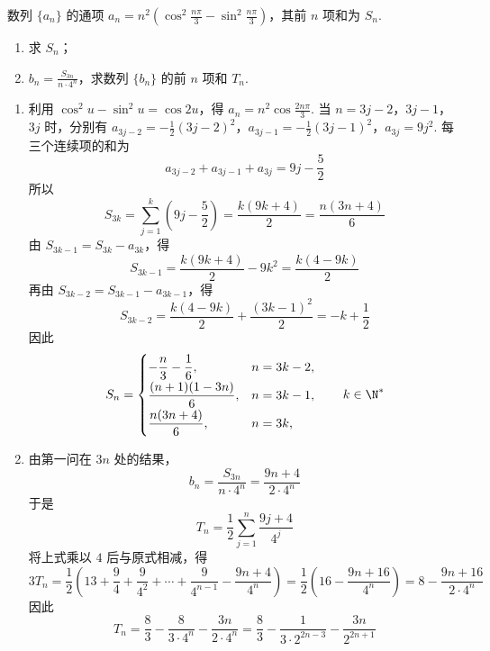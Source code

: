 \begin{problem}
数列 \(\{a_{n}\}\) 的通项 \(a_{n} = n^{2}\left(\cos^{2}\frac{n\pi}{3} - \sin^{2}\frac{n\pi}{3}\right)\)，其前 \(n\) 项和为 \(S_{n}\).

\begin{enumerate}
\item 求 \(S_{n}\)；
\item \( b_{n}=\frac{S_{3n}}{n\cdot4^{n}} \)，求数列 \(\{b_{n}\}\) 的前 \(n\) 项和 \(T_{n}\).
\end{enumerate}
\begin{solution}
\begin{enumerate}
\item
利用 \(\cos^{2}u-\sin^{2}u=\cos2u\)，得 \(a_n=n^{2}\cos\frac{2n\pi}{3}\). 当 \(n=3j-2\)，\(3j-1\)，\(3j\) 时，分别有
\(a_{3j-2}=-\frac12(3j-2)^{2}\)，\(a_{3j-1}=-\frac12(3j-1)^{2}\)，\(a_{3j}=9j^{2}\).
每三个连续项的和为
\[
a_{3j-2}+a_{3j-1}+a_{3j}=9j-\frac52
\]
所以
\[
S_{3k}=\sum_{j=1}^{k}\left(9j-\frac52\right)=\frac{k(9k+4)}2=\frac{n(3n+4)}6
\]
由 \(S_{3k-1}=S_{3k}-a_{3k}\)，得
\[
S_{3k-1}=\frac{k(9k+4)}2-9k^{2}=\frac{k(4-9k)}2
\]
再由 \(S_{3k-2}=S_{3k-1}-a_{3k-1}\)，得
\[
S_{3k-2}=\frac{k(4-9k)}2+\frac{(3k-1)^{2}}2=-k+\frac12
\]
因此
\[
S_n=
\begin{cases}
-\dfrac{n}{3}-\dfrac{1}{6},&n=3k-2,\\[4pt]
\dfrac{(n+1)(1-3n)}6,&n=3k-1,\\[4pt]
\dfrac{n(3n+4)}6,&n=3k,
\end{cases}
\qquad k\in\N^*
\]

\item
由第一问在 \(3n\) 处的结果，
\[
b_n=\frac{S_{3n}}{n\cdot4^n}=\frac{9n+4}{2\cdot4^n}
\]
于是
\[
T_n=\frac12\sum_{j=1}^{n}\frac{9j+4}{4^j}
\]
将上式乘以 \(4\) 后与原式相减，得
\[
3T_n=\frac12\left(13+\frac94+\frac9{4^2}+\cdots+\frac9{4^{n-1}}-\frac{9n+4}{4^n}\right)
=\frac12\left(16-\frac{9n+16}{4^n}\right)
=8-\frac{9n+16}{2\cdot4^n}
\]
因此
\[
T_n=\frac83-\frac{8}{3\cdot4^n}-\frac{3n}{2\cdot4^n}
=\frac83-\frac{1}{3\cdot2^{2n-3}}-\frac{3n}{2^{2n+1}}
\]
\end{enumerate}
\end{solution}
\end{problem}

